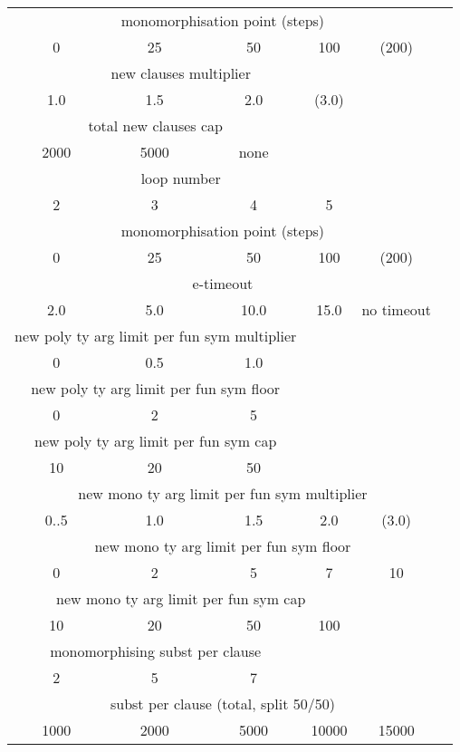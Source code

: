 \documentclass{article}
\begin{document}
\begin{center}
\begin{tabular}{cccccc}
   \toprule
   \multicolumn{5}{c}{monomorphisation point (steps)} \\
   0 & 25 & 50 & 100 & (200) \\
   \midrule
   \multicolumn{4}{c}{new clauses multiplier} \\
   1.0 & 1.5 & 2.0 & (3.0) \\
   \midrule
   \multicolumn{3}{c}{total new clauses cap} \\
   2000 & 5000 & none\\
   \midrule
   \multicolumn{4}{c}{loop number} \\
   2 & 3 & 4 & 5 \\
   \midrule
   \multicolumn{5}{c}{monomorphisation point (steps)} \\
   0 & 25 & 50 & 100 & (200) \\
   \midrule
   \multicolumn{5}{c}{e-timeout} \\
   2.0 & 5.0 & 10.0 & 15.0 & no timeout \\
   \midrule
   \multicolumn{3}{c}{new poly ty arg limit per fun sym multiplier} \\
   0 & 0.5 & 1.0  \\
   \midrule
   \multicolumn{3}{c}{new poly ty arg limit per fun sym floor} \\
   0 & 2 & 5  \\
   \midrule
   \multicolumn{3}{c}{new poly ty arg limit per fun sym cap} \\
   10 & 20 & 50  \\
   \midrule
   \multicolumn{5}{c}{new mono ty arg limit per fun sym multiplier} \\
   0..5 & 1.0 & 1.5 & 2.0 & (3.0)\\
   \midrule
   \multicolumn{5}{c}{new mono ty arg limit per fun sym floor} \\
   0 & 2 & 5 & 7 & 10\\
   \midrule
   \multicolumn{4}{c}{new mono ty arg limit per fun sym cap} \\
   10 & 20 & 50 & 100  \\
   \midrule
   \multicolumn{3}{c}{monomorphising subst per clause} \\
   2 & 5 & 7  \\
   \midrule
   \multicolumn{5}{c}{subst per clause (total, split 50/50)} \\
   1000 & 2000 & 5000 & 10000 & 15000  \\

   \bottomrule
\end{tabular}
\end{center}
\end{document}
